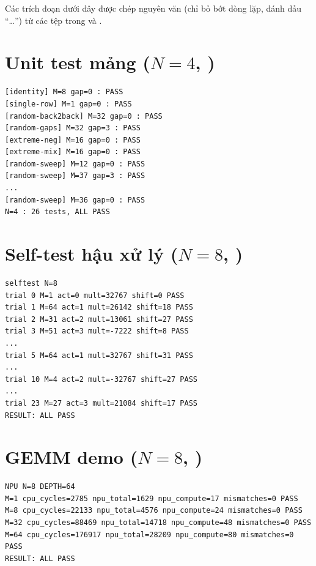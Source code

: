 Các trích đoạn dưới đây được chép nguyên văn (chỉ bỏ bớt dòng lặp, đánh dấu ``\ldots'') từ các tệp trong  và .

\section{Unit test mảng (\texorpdfstring{$N=4$}{N=4}, )}
\begin{lstlisting}[style=codelog]
[identity] M=8 gap=0 : PASS
[single-row] M=1 gap=0 : PASS
[random-back2back] M=32 gap=0 : PASS
[random-gaps] M=32 gap=3 : PASS
[extreme-neg] M=16 gap=0 : PASS
[extreme-mix] M=16 gap=0 : PASS
[random-sweep] M=12 gap=0 : PASS
[random-sweep] M=37 gap=3 : PASS
...
[random-sweep] M=36 gap=0 : PASS
N=4 : 26 tests, ALL PASS
\end{lstlisting}

\section{Self-test hậu xử lý (\texorpdfstring{$N=8$}{N=8}, )}
\begin{lstlisting}[style=codelog]
selftest N=8
trial 0 M=1 act=0 mult=32767 shift=0 PASS
trial 1 M=64 act=1 mult=26142 shift=18 PASS
trial 2 M=31 act=2 mult=13061 shift=27 PASS
trial 3 M=51 act=3 mult=-7222 shift=8 PASS
...
trial 5 M=64 act=1 mult=32767 shift=31 PASS
...
trial 10 M=4 act=2 mult=-32767 shift=27 PASS
...
trial 23 M=27 act=3 mult=21084 shift=17 PASS
RESULT: ALL PASS
\end{lstlisting}

\section{GEMM demo (\texorpdfstring{$N=8$}{N=8}, )}
\begin{lstlisting}[style=codelog]
NPU N=8 DEPTH=64
M=1 cpu_cycles=2785 npu_total=1629 npu_compute=17 mismatches=0 PASS
M=8 cpu_cycles=22133 npu_total=4576 npu_compute=24 mismatches=0 PASS
M=32 cpu_cycles=88469 npu_total=14718 npu_compute=48 mismatches=0 PASS
M=64 cpu_cycles=176917 npu_total=28209 npu_compute=80 mismatches=0 PASS
RESULT: ALL PASS
\end{lstlisting}

